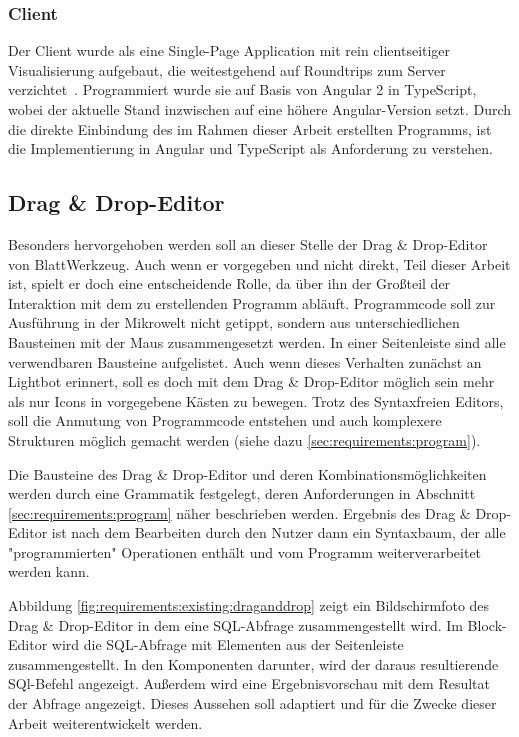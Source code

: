 \subsubsection{Client}

Der Client wurde als eine Single-Page Application mit rein clientseitiger Visualisierung aufgebaut, die weitestgehend auf Roundtrips zum Server verzichtet~\cite[94-95]{riemer2016}. Programmiert wurde sie auf Basis von Angular 2 in TypeScript, wobei der aktuelle Stand inzwischen auf eine höhere Angular-Version setzt. Durch die direkte Einbindung des im Rahmen dieser Arbeit erstellten Programms, ist die Implementierung in Angular und TypeScript als Anforderung zu verstehen.

\subsection{Drag \& Drop-Editor}
\label{sec:requirements:existing:structure:drag-drop}

Besonders hervorgehoben werden soll an dieser Stelle der Drag \& Drop-Editor von BlattWerkzeug. Auch wenn er vorgegeben und nicht direkt, Teil dieser Arbeit ist, spielt er doch eine entscheidende Rolle, da über ihn der Großteil der Interaktion mit dem zu erstellenden Programm abläuft. Programmcode soll zur Ausführung in der Mikrowelt nicht getippt, sondern aus unterschiedlichen Bausteinen mit der Maus zusammengesetzt werden. In einer Seitenleiste sind alle verwendbaren Bausteine aufgelistet. Auch wenn dieses Verhalten zunächst an Lightbot erinnert, soll es doch mit dem Drag \& Drop-Editor möglich sein mehr als nur Icons in vorgegebene Kästen zu bewegen. Trotz des Syntaxfreien Editors, soll die Anmutung von Programmcode entstehen und auch komplexere Strukturen möglich gemacht werden (siehe dazu \ref{sec:requirements:program}).

Die Bausteine des Drag \& Drop-Editor und deren Kombinationsmöglichkeiten werden durch eine Grammatik festgelegt, deren Anforderungen in Abschnitt \ref{sec:requirements:program} näher beschrieben werden. Ergebnis des Drag \& Drop-Editor ist nach dem Bearbeiten durch den Nutzer dann ein Syntaxbaum, der alle "programmierten" Operationen enthält und vom Programm weiterverarbeitet werden kann.


Abbildung \ref{fig:requirements:existing:draganddrop} zeigt ein Bildschirmfoto des Drag \& Drop-Editor in dem eine SQL-Abfrage zusammengestellt wird. Im Block-Editor wird die SQL-Abfrage mit Elementen aus der Seitenleiste zusammengestellt. In den Komponenten darunter, wird der daraus resultierende SQl-Befehl angezeigt. Außerdem wird eine Ergebnisvorschau mit dem Resultat der Abfrage angezeigt. Dieses Aussehen soll adaptiert und für die Zwecke dieser Arbeit weiterentwickelt werden.


